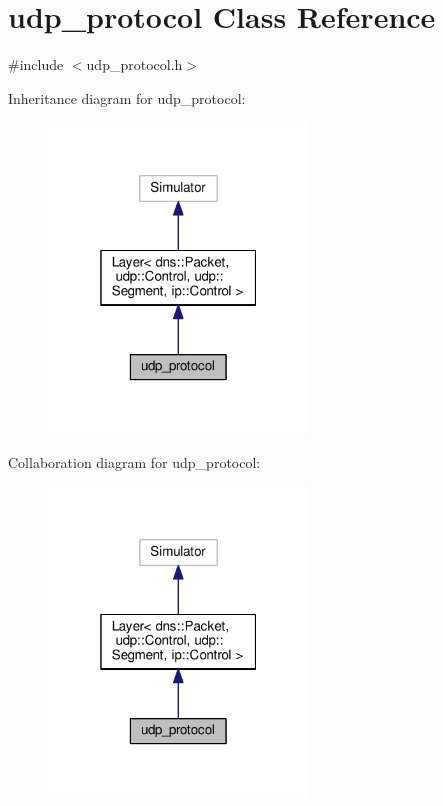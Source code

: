 \hypertarget{classudp__protocol}{}\section{udp\+\_\+protocol Class Reference}
\label{classudp__protocol}


{\ttfamily \#include $<$udp\+\_\+protocol.\+h$>$}



Inheritance diagram for udp\+\_\+protocol\+:
\nopagebreak
\begin{figure}[H]
\begin{center}
\leavevmode
\includegraphics[width=196pt]{classudp__protocol__inherit__graph}
\end{center}
\end{figure}


Collaboration diagram for udp\+\_\+protocol\+:
\nopagebreak
\begin{figure}[H]
\begin{center}
\leavevmode
\includegraphics[width=196pt]{classudp__protocol__coll__graph}
\end{center}
\end{figure}
